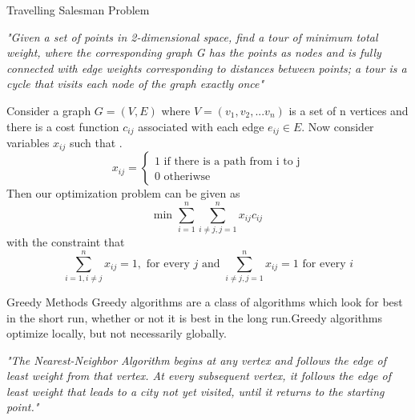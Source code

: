 \documentclass[9pt]{beamer}
\begin{document}
\begin{frame}{Travelling Salesman Problem}
\begin{definition}

\emph{"Given a set of points in 2-dimensional space, find a tour
of minimum total weight, where the corresponding graph G has the points as nodes and is fully
connected with edge weights corresponding to distances between points; a tour is a cycle that visits each node of the graph exactly once"}

\end{definition}
Consider a graph $G= (V,E) $ where $V = (v_1, v_2, ...v_n)$ is a set of n vertices and there is a cost function $c_{ij}$ associated with each edge $e_{ij} \in E$. Now consider variables $x_{ij}$ such that .
$$ 
x_{ij} =
\begin{cases}
    1 \text{  if there is a path from i to j}\\    
 0  \text{  otheriwse}
\end{cases} $$
Then our optimization problem can be given as 
$$ \text{min } \sum_{i=1}^n  \sum_{i \neq j,j=1}^n x_{ij}c_{ij}$$
with the constraint that 
$$  \sum_{i=1,i \neq j}^n x_{ij}=1, \text{ for every $j$ and }  \sum_{i \neq j,j=1}^n x_{ij}=1  \text{ for every $i$} $$
\end{frame}
\begin{frame}{Greedy Methods}
Greedy algorithms are a class of algorithms which look for best in the short run, whether or not it is best in the long run.Greedy algorithms optimize locally, but not necessarily globally.
\begin{definition}

\emph{"The Nearest-Neighbor Algorithm begins at any vertex and follows the
edge of least weight from that vertex. At every subsequent vertex, it
follows the edge of least weight that leads to a city not yet visited, until
it returns to the starting point."}

\end{definition}

\end{frame}
\end{document}
